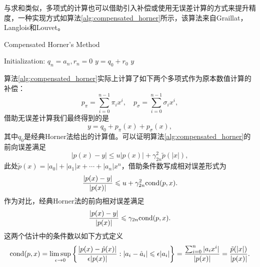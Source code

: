 \documentclass[a4paper,10pt]{ctexart}
\begin{document}
与求和类似，多项式的计算也可以借助引入补偿或使用无误差计算的方式来提升精度，一种实现方式如算法\ref{alg:compensated_horner}所示，该算法来自Graillat，Langlois和Louvet。
\begin{algorithm}
    \caption{Compensated Horner's Method}\label{alg:compensated_horner}
    Initialization: $ q_n = a_n, r_n = 0 $\;
    $ y = q_0 + r_0 $\;
    \Return $ y $\;
\end{algorithm}

算法\ref{alg:compensated_horner}实际上计算了如下两个多项式作为原本数值计算的补偿：
\begin{equation}
    p_\pi = \sum_{i=0}^{n-1} \pi_i x^i,\quad p_\sigma = \sum_{i=0}^{n-1} \sigma_i x^i,
\end{equation}
借助无误差计算我们最终得到的是
\[
    y = q_0 + p_\pi(x) + p_\sigma(x),
\]
其中$ q_0 $是经典Horner法给出的计算值。可以证明算法\ref{alg:compensated_horner}的前向误差满足
\begin{equation}
    |p(x) - y| \leqslant  u|p(x)| + \gamma_{2n}^2 \tilde{p}(|x|),
\end{equation}
此处$ \tilde{p}(x) = |a_0| + |a_1|x + \cdots + |a_n| x^n $，借助条件数写成相对误差形式为
\begin{equation}
    \frac{|p(x) - y|}{|p(x)|} \leqslant u + \gamma_{2n}^2 {\rm cond}(p,x).
\end{equation}
作为对比，经典Horner法的前向相对误差满足
\begin{equation}
    \frac{|p(x) - y|}{|p(x)|} \leqslant \gamma_{2n} {\rm cond}(p,x).
\end{equation}
这两个估计中的条件数以如下方式定义
\[
    {\rm cond}(p,x) = \limsup_{\epsilon\to 0}\left\{ \frac{|p(x) - \hat{p}(x)|}{\epsilon|p(x)|}:|a_i-\hat{a}_i|\leqslant \epsilon |a_i| \right\}  = \frac{\sum_{i=0}^n |a_i x^i|}{|p(x)|} = \frac{\tilde{p}(|x|)}{|p(x)|}.
\]
\end{document}
